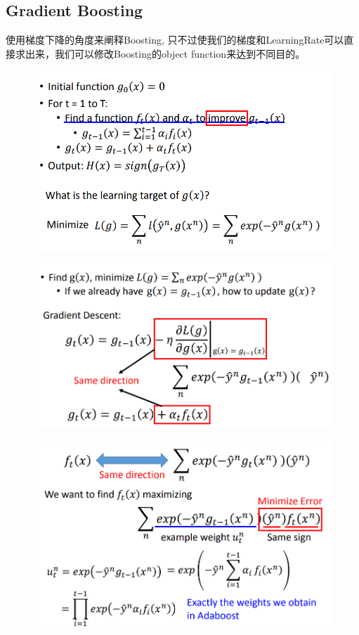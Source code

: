 \subsection{Gradient Boosting}
使用梯度下降的角度来阐释Boosting, 只不过使我们的梯度和LearningRate可以直接求出来，我们可以修改Boosting的object function来达到不同目的。
\begin{figure}[H]
    \centerline{\includegraphics[scale=0.5]{Part1/Chapter/images/gb1.png}}
\end{figure}
\begin{figure}[H]
    \centerline{\includegraphics[scale=0.5]{Part1/Chapter/images/gb2.png}}
   
\end{figure}
\begin{figure}[H]
    \centerline{\includegraphics[scale=0.5]{Part1/Chapter/images/gb3.png}}
\end{figure}
